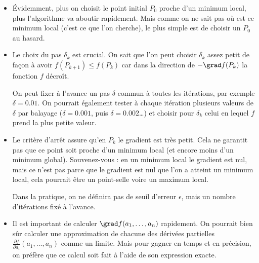 \begin{itemize}
	\item \'Evidemment, plus on choisit le point initial $P_0$ proche d'un minimum local, plus l'algorithme va aboutir rapidement. Mais comme on ne sait pas où est ce minimum local (c'est ce que l'on cherche), le plus simple est de choisir un $P_0$ au hasard.
	
	\item Le choix du pas $\delta_k$ est crucial. On sait que l'on peut choisir $\delta_k$ assez petit de façon à avoir $f(P_{k+1}) \le f(P_k)$ car dans la direction de $-\grad f(P_k)$ la fonction $f$ décroît.
	
	
	On peut fixer à l'avance un pas $\delta$ commun à toutes les itérations, par exemple $\delta = 0.01$. On pourrait également tester à chaque itération plusieurs valeurs de $\delta$ par balayage ($\delta = 0.001$, puis $\delta=0.002$\ldots) et choisir pour $\delta_k$ celui en lequel $f$ prend la plus petite valeur.
	
	\item Le critère d'arrêt assure qu'en $P_k$ le gradient est très petit. Cela ne garantit pas que ce point soit proche d'un minimum local (et encore moins d'un minimum global). Souvenez-vous : en un minimum local le gradient est nul, mais ce n'est pas parce que le gradient est nul que l'on a atteint un minimum local, cela pourrait être un point-selle voire un maximum local.
	
	Dans la pratique, on ne définira pas de seuil d'erreur $\epsilon$, mais un nombre d'itérations fixé à l'avance.
	
	\item Il est important de calculer $\grad f(a_1,\ldots,a_n)$ rapidement. On pourrait bien sûr calculer une approximation de chacune des dérivées partielles $\frac{\partial f}{\partial a_i}(a_1,\ldots,a_n)$ comme un limite. Mais pour gagner en temps et en précision, on préfère que ce calcul soit fait à l'aide de son expression exacte. 
	
\end{itemize}






































